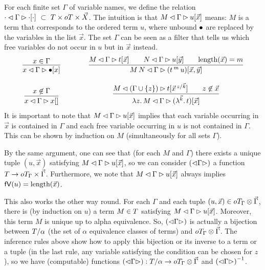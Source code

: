 \documentclass[submission,copyright,creativecommons]{eptcs}
\begin{document}
For each finite %
set $\Gamma$ of variable names, we define the relation
$\cdot \lhd \Gamma \rhd \cdot[\cdot] ~ \subset ~ T \times oT \times \vec {X}$.
The intuition is that $M \lhd \Gamma \rhd u[\vec x]$ means: 
$M$ is a term that corresponds to the ordered term $u$, where unbound $\mathord{\bullet}$ are replaced by the variables in the list $\vec x$. 
The set $\Gamma$ can be seen as a filter that tells us which free variables do not occur in $u$ but in $\vec x$ instead.
\[
\begin{array}{c@{\qquad\qquad} c}
\infru{x \in \Gamma}{\parseb x \Gamma \ovar x}
&
\infru{ {\parseb M \Gamma t {\vec x}} \qquad 
        {\parseb N \Gamma u {\vec y}} \qquad {\length{\vec x} = m} } 
      {\parseb {M\,N} {\Gamma} {(\ApO t m u)}  {\vec x, \vec y} } 
\\ \\
\infru{x \not\in \Gamma}{\parseb x \Gamma x {}}
&
\infru{ 
         {\parseb M { (\Gamma \cup \{z\}) }  t {\multiinsert{\vec x}{\vec k}{z}   }} 
          \qquad 
          z \not\in \vec x  }
          {\parseb {\LaA z M} {\Gamma} {(\LaO {\vec{k}} t)} {\vec x}}
\end{array}
\]
It is important to note that $M \lhd \Gamma \rhd u[\vec x]$ implies that each variable occurring in $\vec x$ is contained in $\Gamma$ and each free variable occurring in $u$ is not contained in $\Gamma$. This can be shown by induction on $M$ (simultaneously for all sets $\Gamma$). 

By the same argument, one can see that (for each $M$ and $\Gamma$) there exists a unique tuple $(u, \vec x)$ satisfying $M \lhd \Gamma \rhd u[\vec x]$, so we can consider $\left(\mathord{\lhd} {\Gamma} \mathord{\rhd}\right)$ a function $T \rightarrow oT_\Gamma \times \vec \Gamma$. Furthermore, we note that $M \lhd \Gamma \rhd u[\vec x]$ always implies $\mathsf{fV}(u) = \mbox{length}(\vec x)$. 

This also works the other way round. For each $\Gamma$ and each tuple $(u, \vec x) \in oT_\Gamma \otimes \vec \Gamma$, there is (by induction on $u$) a term $M \in T$ satisfying $M \lhd \Gamma \rhd u[\vec x]$. Moreover, this term $M$ is unique up to alpha equivalence. So, $\left(\mathord{\lhd} {\Gamma} \mathord{\rhd}\right)$ is actually a bijection between $T / \alpha$ (the set of $\alpha$ equivalence classes of terms) and $oT_\Gamma \otimes \vec \Gamma$. The inference rules above show how to apply this bijection or its inverse to a term or a tuple (in the last rule, any variable satisfying the condition can be chosen for $z$), so we have (computable) functions $\left(\mathord{\lhd} {\Gamma} \mathord{\rhd}\right) : T / \alpha \rightarrow oT_\Gamma \otimes \vec \Gamma$ and $\left(\mathord{\lhd} {\Gamma} \mathord{\rhd}\right) ^{-1}$. 
\end{document}
